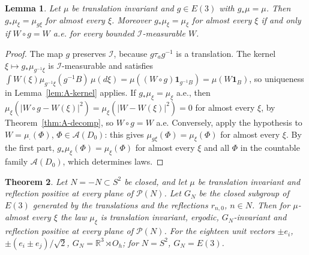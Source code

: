 \documentclass[11pt]{amsart}
\theoremstyle{plain}
\newtheorem{theorem}{Theorem}[section]
\newtheorem{lemma}[theorem]{Lemma}
\theoremstyle{definition}
\theoremstyle{remark}
\numberwithin{equation}{section}
\newcommand{\R}{\mathbb{R}}
\newcommand{\cA}{\mathcal{A}}
\newcommand{\cI}{\mathcal{I}}
\newcommand{\cP}{\mathcal{P}}
\newcommand{\Oh}{O_h}
\newcommand{\Eu}{E(3)}
\newcommand{\abs}[1]{\lvert #1\rvert}
\begin{document}
\begin{lemma}\label{lem:A-equiv}
Let $\mu$ be translation invariant and $g\in\Eu$ with $g_*\mu=\mu$. Then $g_*\mu_\xi=\mu_{g\xi}$ for almost every $\xi$. Moreover $g_*\mu_\xi=\mu_\xi$ for almost every $\xi$ if and only if $W\circ g=W$ a.e. for every bounded $\cI$-measurable $W$.
\end{lemma}

\begin{proof}
The map $g$ preserves $\cI$, because $g\tau_ag^{-1}$ is a translation. The kernel $\xi\mapsto g_*\mu_{g^{-1}\xi}$ is $\cI$-measurable and satisfies $\int W(\xi)\mu_{g^{-1}\xi}(g^{-1}B)\,\mu(d\xi)=\mu((W\circ g)\mathbf 1_{g^{-1}B})=\mu(W\mathbf 1_B)$, so uniqueness in Lemma~\ref{lem:A-kernel} applies. If $g_*\mu_\xi=\mu_\xi$ a.e., then $\mu_\xi(\abs{W\circ g-W(\xi)}^2)=\mu_\xi(\abs{W-W(\xi)}^2)=0$ for almost every $\xi$, by Theorem~\ref{thm:A-decomp}, so $W\circ g=W$ a.e. Conversely, apply the hypothesis to $W=\mu_\cdot(\Phi)$, $\Phi\in\cA(D_0)$: this gives $\mu_{g\xi}(\Phi)=\mu_\xi(\Phi)$ for almost every $\xi$. By the first part, $g_*\mu_\xi(\Phi)=\mu_\xi(\Phi)$ for almost every $\xi$ and all $\Phi$ in the countable family $\cA(D_0)$, which determines laws.
\end{proof}

\begin{theorem}\label{thm:A-inherit}
Let $N=-N\subset S^2$ be closed, and let $\mu$ be translation invariant and reflection positive at every plane of $\cP(N)$. Let $G_N$ be the closed subgroup of $\Eu$ generated by the translations and the reflections $r_{n,0}$, $n\in N$. Then for $\mu$-almost every $\xi$ the law $\mu_\xi$ is translation invariant, ergodic, $G_N$-invariant and reflection positive at every plane of $\cP(N)$. For the eighteen unit vectors $\pm e_i$, $\pm(e_i\pm e_j)/\sqrt2$, $G_N=\R^3\rtimes\Oh$; for $N=S^2$, $G_N=\Eu$.
\end{theorem}
\end{document}
